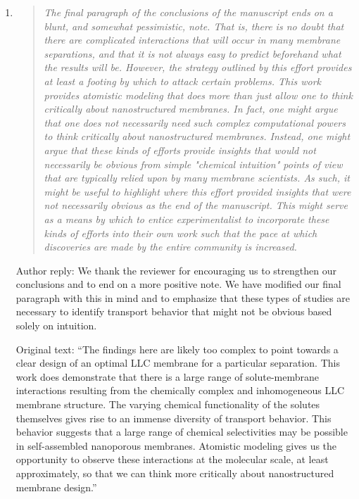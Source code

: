 \documentclass{article}
\begin{document}
\begin{enumerate}
    \item \begin{quote}
    \textit{The final paragraph of the conclusions of the manuscript ends on a blunt, and 
    somewhat pessimistic, note. That is, there is no doubt that there are complicated 
    interactions that will occur in many membrane separations, and that it is not always 
    easy to predict beforehand what the results will be. However, the strategy outlined 
    by this effort provides at least a footing by which to attack certain problems. This
    work provides atomistic modeling that does more than just allow one to think critically
    about nanostructured membranes. In fact, one might argue that one does not necessarily
    need such complex computational powers to think critically about nanostructured 
    membranes. Instead, one might argue that these kinds of efforts provide insights that
    would not necessarily be obvious from simple "chemical intuition" points of view that 
    are typically relied upon by many membrane scientists. As such, it might be useful to
    highlight where this effort provided insights that were not necessarily obvious as the
    end of the manuscript. This might serve as a means by which to entice experimentalist
    to incorporate these kinds of efforts into their own work such that the pace at which
    discoveries are made by the entire community is increased.}
    \end{quote}
	
    Author reply: We thank the reviewer for encouraging us to strengthen our conclusions and
    to end on a more positive note. We have modified our final paragraph with this in mind 
    and to emphasize that these types of studies are necessary to identify transport behavior
    that might not be obvious based solely on intuition.
    
    Original text: ``The findings here are likely too complex to point towards a clear 
    design of an optimal LLC membrane for a particular separation. This work does demonstrate
    that there is a large range of solute-membrane interactions resulting from the
    chemically complex and inhomogeneous LLC membrane structure. The varying chemical 
    functionality of the solutes themselves gives rise to an immense diversity of transport 
    behavior. This behavior suggests that a large range of chemical selectivities may be 
    possible in self-assembled nanoporous membranes. Atomistic modeling gives us the 
    opportunity to observe these interactions at the molecular scale, at least approximately,
    so that we can think more critically about nanostructured membrane design.''
    

\end{enumerate}
\end{document}

